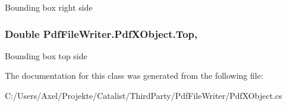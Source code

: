 Bounding box right side 

\subsubsection[{\texorpdfstring{Top}{Top}}]{\setlength{\rightskip}{0pt plus 5cm}Double Pdf\+File\+Writer.\+Pdf\+X\+Object.\+Top\hspace{0.3cm}{\ttfamily [get]}, {\ttfamily [set]}}\hypertarget{class_pdf_file_writer_1_1_pdf_x_object_aef335a0c44ebde448d00164b341d361c}{}\label{class_pdf_file_writer_1_1_pdf_x_object_aef335a0c44ebde448d00164b341d361c}


Bounding box top side 



The documentation for this class was generated from the following file\+:\begin{DoxyCompactItemize}
\item 
C\+:/\+Users/\+Axel/\+Projekte/\+Catalist/\+Third\+Party/\+Pdf\+File\+Writer/Pdf\+X\+Object.\+cs\end{DoxyCompactItemize}
